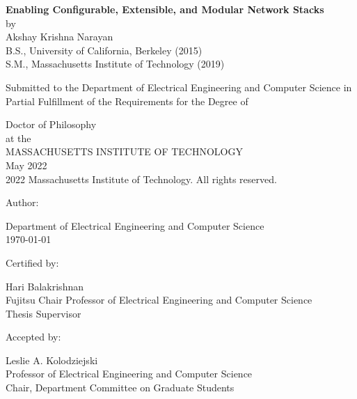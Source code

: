 \documentclass[fontsize=12pt,paper=letter]{scrartcl}
\begin{document}
\begin{titlepage}
  \begin{center}
    \textbf{\large Enabling Configurable, Extensible, and Modular Network Stacks}\\
    \vspace{0.5\baselineskip}
    by\\
    \vspace{0.5\baselineskip}
    {\large Akshay Krishna Narayan}\\
    \vspace{0.5\baselineskip}
    B.S., University of California, Berkeley (2015)\\
    S.M., Massachusetts Institute of Technology (2019)\\
    \vspace{0.5\baselineskip}
    \begin{addmargin}[0.1in]{0.1in}
      \centering
      Submitted to the Department of
      Electrical Engineering and Computer Science
      in Partial Fulfillment of the Requirements for the Degree of\\
    \end{addmargin}
    \vspace{0.5\baselineskip}
    Doctor of Philosophy\\
    \vspace{0.5\baselineskip}
    at the\\
    \vspace{0.5\baselineskip}
    MASSACHUSETTS INSTITUTE OF TECHNOLOGY\\
    \vspace{0.5\baselineskip}
    May 2022\\
    \textcopyright{} 2022 Massachusetts Institute of Technology.
    All rights reserved.
  \end{center}

  \vspace{2\baselineskip}
  {
  \raggedright
  Author: \dotfill

  \raggedleft
  Department of Electrical Engineering and Computer Science\\
  \today{}\\
  }

  \vspace{2\baselineskip}
  {
  \raggedright
  Certified by: \dotfill

  \raggedleft
  Hari Balakrishnan\\
  Fujitsu Chair Professor of Electrical Engineering and Computer Science\\
  Thesis Supervisor\\
  }

  \vspace{2\baselineskip}

  {
  \raggedright
  Accepted by: \dotfill

  \raggedleft
  Leslie A. Kolodziejski\\
  Professor of Electrical Engineering and Computer Science\\
  Chair, Department Committee on Graduate Students\\
  }
\end{titlepage}
\end{document}
